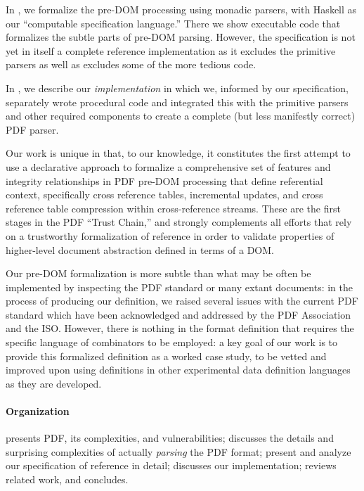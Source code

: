 In , we formalize the pre-DOM processing using
monadic parsers, with Haskell as our ``computable specification language.''
There we show executable code that formalizes the subtle parts of
pre-DOM parsing.
However, the specification is not yet in itself a complete
reference implementation as it excludes the primitive
parsers as well as excludes some of the more tedious code.

In , we describe our \emph{implementation} in which we,
informed by our specification, separately wrote procedural code and
integrated this with the primitive parsers and other required
components to create a complete (but less manifestly correct)
PDF parser.

Our work is unique in that, to our knowledge, it constitutes
the first attempt to use a declarative approach to formalize a comprehensive
set of features and integrity relationships in PDF pre-DOM processing
that define referential context, specifically cross reference tables,
incremental updates, and cross reference table compression within
cross-reference streams.
These are the first stages in the PDF ``Trust Chain,'' and  strongly complements all
efforts that rely on a trustworthy formalization of reference in order
to validate properties of higher-level document abstraction defined in
terms of a DOM.

Our pre-DOM formalization is more subtle than what may be often be
implemented by inspecting the PDF standard or many extant documents:
in the process of producing our definition, we raised several issues
with the current PDF standard which have been acknowledged and
addressed by the PDF Association and the ISO.
%
However, there is nothing in the format definition that requires the
specific language of combinators to be employed: a key goal of our work is
to provide this formalized definition as a worked case study, to be
vetted and improved upon using definitions in other experimental data
definition languages as they are developed.

\paragraph*{Organization}
%
 presents PDF, its complexities, and vulnerabilities;
%
 discusses the details and surprising
complexities of actually \emph{parsing} the PDF format;
%
 present and analyze our
specification of reference in detail;
%
 discusses our implementation;
%
 reviews related work, and %
 concludes.

